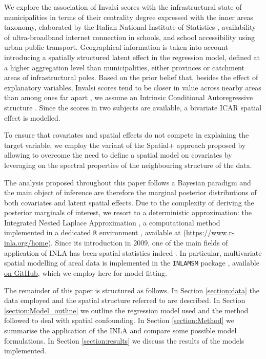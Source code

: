 \documentclass{book}
\begin{document}
We explore the association of Invalsi scores with the infrastructural state of municipalities in terms of their centrality degree expressed with the inner areas taxonomy, elaborated by the Italian National Institute of Statistics \citep[ISTAT hereinafter, ][]{InnerAreas}, availability of ultra-broadband internet connection in schools, and school accessibility using urban public transport. Geographical information is taken into account introducing a spatially structured latent effect in the regression model, defined at a higher aggregation level than municipalities, either provinces or catchment areas of infrastructural poles. Based on the prior belief that, besides the effect of explanatory variables, Invalsi scores tend to be closer in value across nearby areas than among ones far apart \citep{CAR}, we assume an Intrinsic Conditional Autoregressive structure \citep[hereinafter ICAR, ][]{BYM}. Since the scores in two subjects are available, a bivariate ICAR \citep{Mardia} spatial effect is modelled.

To ensure that covariates and spatial effects do not compete in explaining the target variable, we employ the variant of the Spatial+ approach proposed by \citep{Urdangarin24} allowing to overcome the need to define a spatial model on covariates by leveraging on the spectral properties of the neighbouring structure of the data.

The analysis proposed throughout this paper follows a Bayesian paradigm and the main object of inference are therefore the marginal posterior distributions of both covariates and latent spatial effects. Due to the complexity of deriving the posterior marginals of interest, we resort to a deterministic approximation: the Integrated Nested Laplace Approximation \citep[INLA hereinafter, ][]{INLA, VBINLA}, a computational method implemented in a dedicated \texttt{R} environment \citep[\texttt{R-INLA},][]{INLAbook, Wang}, available at (\url{https://www.r-inla.org/home}). Since its introduction in 2009, one of the main fields of application of INLA has been spatial statistics indeed \citep{INLArev, Blangiardo}. In particular, multivariate spatial modelling of areal data is implemented in the \texttt{INLAMSM} package \citep{INLAMSM, INLAMSM2}, available \href{https://github.com/becarioprecario/INLAMSM}{on GitHub}, which we employ here for model fitting.
 
The remainder of this paper is structured as follows. In Section \ref{section:data} the data employed and the spatial structure referred to are described. In Section \ref{section:Model_outline} we outline the regression model used and the method followed to deal with spatial confounding. In Section \ref{section:Method} we summarise the application of the INLA and compare some possible model formulations. In Section \ref{section:results} we discuss the results of the models implemented.
\end{document}
